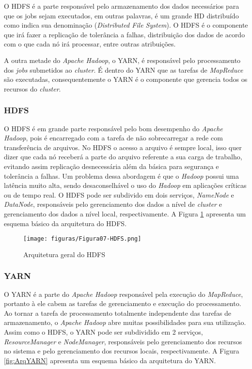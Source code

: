 O HDFS é a parte responsável pelo armazenamento dos dados necessários para que os jobs sejam executados, em outras palavras, é um grande HD distribuído como indica sua denominação (\emph{Distributed File System}). O HDFS é o componente que irá fazer a replicação de tolerância a falhas, distribuição dos dados de acordo com o que cada nó irá processar, entre outras atribuições.

A outra metade do \emph{Apache Hadoop}, o YARN, é responsável pelo processamento dos \emph{jobs} submetidos ao \emph{cluster}. É dentro do YARN que as tarefas de \emph{MapReduce} são executadas, consequentemente o YARN é o componente que gerencia todos os recursos do \emph{cluster}. 

\subsubsection{HDFS}
O HDFS é em grande parte responsável pelo bom desempenho do \emph{Apache Hadoop}, pois é encarregado com a tarefa de não sobrecarregar a rede com transferência de arquivos. No HDFS o acesso a arquivo é sempre local, isso quer dizer que cada nó receberá a parte do arquivo referente a sua carga de trabalho, evitando assim replicação desnecessária além da básica para segurança e tolerância a falhas.
Um problema dessa abordagem é que o \emph{Hadoop} possui uma latência muito alta, sendo desaconselhável o uso do \emph{Hadoop} em aplicações críticas ou de tempo real. O HDFS pode ser subdivido em dois serviços, \emph{NameNode} e \emph{DataNode}, responsáveis pelo gerenciamento dos dados a nível de \emph{cluster} e gerenciamento dos dados a nível local, respectivamente. A Figura \ref{fig:ArqHDFS} apresenta um esquema básico da arquitetura do HDFS.

\begin{figure}[hbtn]
   \centering
   \texttt{[image: figuras/Figura07-HDFS.png]}
   \caption{Arquitetura geral do HDFS \cite{HDFS}}
   \label{fig:ArqHDFS}
\end{figure}

\subsubsection{YARN}
O YARN é a parte do \emph{Apache Hadoop} responsável pela execução do \emph{MapReduce}, portanto à ele cabem as tarefas de gerenciamento e execução do processamento. Ao tornar a tarefa de processamento totalmente independente das tarefas de armazenamento, o \emph{Apache Hadoop} abre muitas possibilidades para sua utilização. Assim como o HDFS, o YARN pode ser subdividido em 2 serviços, \emph{ResourceManager} e \emph{NodeManager}, responsáveis pelo gerenciamento dos recursos no sistema e pelo gerenciamento dos recursos locais, respectivamente. A Figura \ref{fig:ArqYARN} apresenta um esquema básico da arquitetura do YARN.

